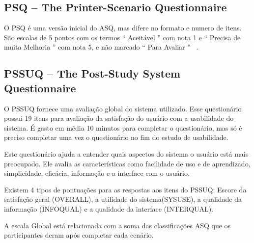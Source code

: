 \subsection{PSQ – The Printer-Scenario Questionnaire}

O PSQ  é uma versão inicial do ASQ, mas difere no formato e numero de itens.  São escalas de 5 pontos com os termos “ Aceitável ” com nota 1 e “ Precisa de muita Melhoria ” com nota 5, e não marcado “ Para Avaliar ” ~\cite{lewis1995ibm}.

\subsection{PSSUQ – The Post-Study System Questionnaire}

	O PSSUQ fornece uma avaliação global do sistema utilizado. Esse questionário possui 19 itens para avaliação da satisfação do usuário com a usabilidade do sistema. É gasto em média 10 minutos para completar o questionário, mas só é preciso completar uma vez o questionário no fim do estudo de usabilidade. ~\cite{lewis1995ibm} 

	Este questionário ajuda a entender quais aspectos do sistema o usuário está mais preocupado. Ele avalia as características como facilidade de uso e de aprendizado, simplicidade, eficácia, informação e a interface com o usuário.

	Existem 4 tipos de pontuações para as respostas aos itens do PSSUQ: Escore da satisfação geral (OVERALL), a utilidade do sistema(SYSUSE), a qualidade da  informação (INFOQUAL) e a qualidade da interface (INTERQUAL). 

A escala Global está relacionada com a soma das classificações ASQ que os participantes deram após completar cada cenário. 


